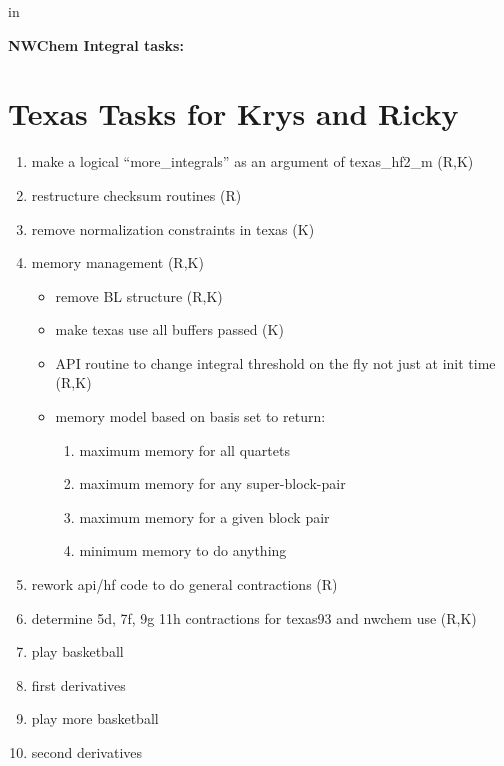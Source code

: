 

\marginparwidth 0pt
\oddsidemargin  0pt
\evensidemargin  0pt
\marginparsep 0pt

\parskip 5pt

\topmargin   0pt

\textwidth   6.5in
 in
\parindent 0cm



{\bf\LARGE NWChem Integral tasks:}

\section{Texas Tasks for Krys and Ricky}
\begin{enumerate}
\item make a logical ``more\_integrals'' as an argument of texas\_hf2\_m (R,K)
\item restructure checksum routines (R)
\item remove normalization constraints in texas (K)
\item memory management (R,K)
\begin{itemize}
\item remove BL structure (R,K)
\item make texas use all buffers passed (K)
\item API routine to change integral threshold on the fly not just at init time (R,K)
\item memory model based on basis set to return:	
\begin{enumerate}
\item maximum memory for all quartets
\item maximum memory for any super-block-pair
\item maximum memory for a given block pair
\item minimum memory to do anything
\end{enumerate}
\end{itemize}
\item rework api/hf code to do general contractions (R)
\item determine 5d, 7f, 9g 11h contractions for texas93 and nwchem use (R,K)
\item play basketball
\item first derivatives
\item play more basketball
\item second derivatives
\end{enumerate}

